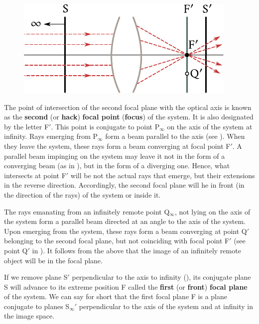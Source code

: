 \begin{figure}[t]
	\begin{center}
		\includegraphics[scale=1]{figures/ch_16/fig_16_13.pdf}
        \caption[]{}
		\label{fig:16_13}
	\end{center}
	\vspace{-0.8cm}
\end{figure}

The point of intersection of the second focal plane with the optical axis is known as the \textbf{second} (or \textbf{hack}) \textbf{focal point} (\textbf{focus}) of the system.
It is also designated by the letter F$'$.
This point is conjugate to point P$_{\infty}$ on the axis of the system at infinity.
Rays emerging from P$_{\infty}$ form a beam parallel to the axis (see ).
When they leave the system, these rays form a beam converging at focal point F$'$.
A parallel beam impinging on the system may leave it not in the form of a converging beam (as in ), but in the form of a diverging one.
Hence, what intersects at point F$'$ will be not the
actual rays that emerge, but their extensions in the reverse direction.
Accordingly, the second focal plane will he in front (in the direction of the rays) of the system or inside it.

The rays emanating from an infinitely remote point Q$_{\infty}$, not lying on the axis of the system form a parallel beam directed at an angle to the axis of the system.
Upon emerging from the system, these rays form a beam converging at point Q$'$ belonging to the second focal plane, but not coinciding with focal point F$'$ (see point Q$'$ in ).
It follows from the above that the image of an infinitely remote object will be in the focal plane.

If we remove plane S$'$ perpendicular to the axis to infinity (), its conjugate plane S will advance to its extreme position F called the \textbf{first} (or \textbf{front}) \textbf{focal plane} of the system.
We can say for short that the first focal plane F is a plane conjugate to planes S$_{\infty}'$ perpendicular to the axis of the system and at infinity in the image space.

